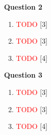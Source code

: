 \par
\noindent
\textbf{Question 2}\\
\begin{enumerate}[label=(\roman*)]

    \item \textcolor{red}{TODO} \hfill [3]

    \item \textcolor{red}{TODO} \hfill [3]

    \item \textcolor{red}{TODO} \hfill [4]

\end{enumerate}

\par
\noindent
\textbf{Question 3}\\
\begin{enumerate}[label=(\roman*)]

    \item \textcolor{red}{TODO} \hfill [3]

    \item \textcolor{red}{TODO} \hfill [3]

    \item \textcolor{red}{TODO} \hfill [4]

\end{enumerate}

